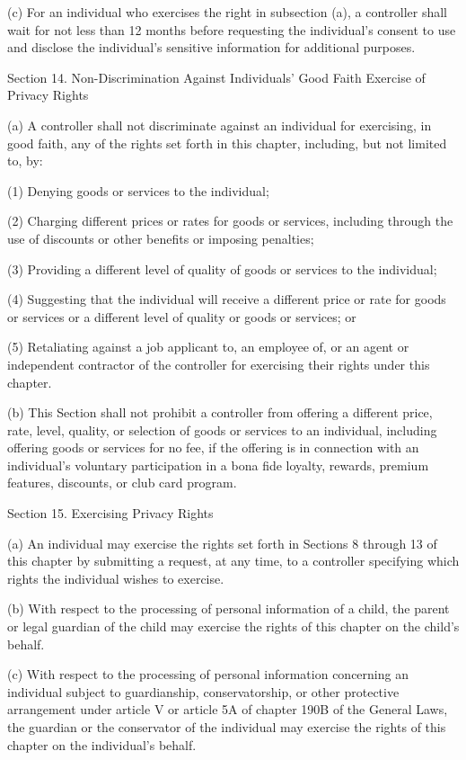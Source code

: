 (c) For an individual who exercises the right in subsection (a), a controller shall wait for not less than 12 months before requesting the individual’s consent to use and disclose the individual’s sensitive information for additional purposes.

Section 14. Non-Discrimination Against Individuals’ Good Faith Exercise of Privacy Rights

(a) A controller shall not discriminate against an individual for exercising, in good faith, any of the rights set forth in this chapter, including, but not limited to, by:

(1) Denying goods or services to the individual;

(2) Charging different prices or rates for goods or services, including through the use of discounts or other benefits or imposing penalties;

(3) Providing a different level of quality of goods or services to the individual;

(4) Suggesting that the individual will receive a different price or rate for goods or services or a different level of quality or goods or services; or

(5) Retaliating against a job applicant to, an employee of, or an agent or independent contractor of the controller for exercising their rights under this chapter. 

(b) This Section shall not prohibit a controller from offering a different price, rate, level, quality, or selection of goods or services to an individual, including offering goods or services for no fee, if the offering is in connection with an individual’s voluntary participation in a bona fide loyalty, rewards, premium features, discounts, or club card program.

Section 15. Exercising Privacy Rights

(a) An individual may exercise the rights set forth in Sections 8 through 13 of this chapter by submitting a request, at any time, to a controller specifying which rights the individual wishes to exercise.

(b) With respect to the processing of personal information of a child, the parent or legal guardian of the child may exercise the rights of this chapter on the child’s behalf.

(c) With respect to the processing of personal information concerning an individual subject to guardianship, conservatorship, or other protective arrangement under article V or article 5A of chapter 190B of the General Laws, the guardian or the conservator of the individual may exercise the rights of this chapter on the individual’s behalf.

